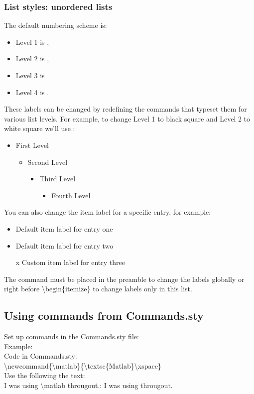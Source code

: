  \subsubsection{List styles: unordered lists} 		%
 The default numbering scheme is: 
 \begin{itemize}
 	\item Level 1 is \textbullet, 
 	\item Level 2 is \textendash, 
 	\item Level 3 is \textasteriskcentered 
 	\item Level 4 is \textperiodcentered. 
 \end{itemize}
 These labels can be changed by redefining the commands that typeset them for various list levels. For example, to change Level 1 to black square and Level 2 to white square we'll use : 
 \renewcommand{\labelitemi}{o}
 \renewcommand\labelitemii{x}
 \begin{itemize}
 	\item  First Level
 	\begin{itemize}
 		\item  Second Level
 		\begin{itemize}
 			\item  Third Level
 			\begin{itemize}
 				\item  Fourth Level
 			\end{itemize}
 		\end{itemize}
 	\end{itemize}
 \end{itemize}
 You can also change the item label for a specific entry, for example: 
 \begin{itemize}
 	\item  Default item label for entry one
 	\item  Default item label for entry two
 	\item[x]  Custom item label for entry three
 \end{itemize}
 The command must be placed in the preamble to change the labels globally or right before \textbackslash begin\{itemize\} to change labels only in this list.
 \subsection{Using commands from Commands.sty} 			%
 \noindent
 Set up commands in the Commands.sty file:\\
 Example:\\
 Code in Commands.sty:\\
 \textbackslash newcommand\{\textbackslash matlab\}\{\textbackslash textsc\{Matlab\}\textbackslash xspace\}\\
 Use the following the text:\\
 I was using \textbackslash matlab througout.: I was using \matlab througout.
 
